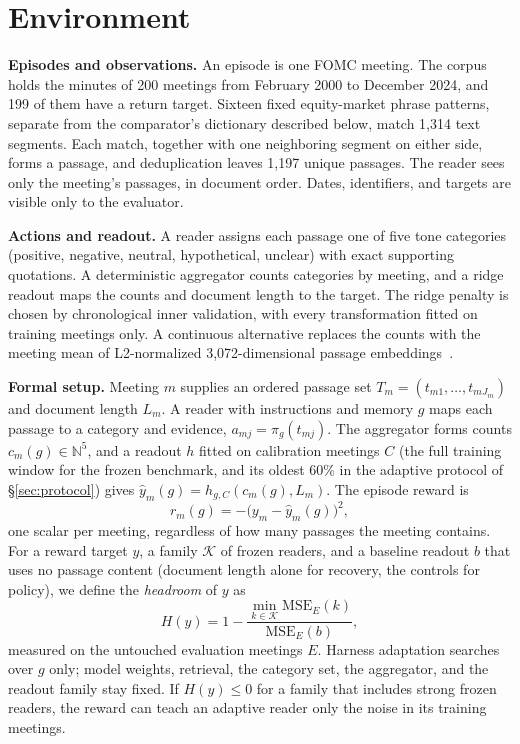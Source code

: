 \documentclass[sigconf]{acmart}
\begin{document}
\section{Environment}\label{sec:env}

\textbf{Episodes and observations.} An episode is one FOMC meeting. The corpus holds the minutes of 200 meetings from February 2000 to December 2024, and 199 of them have a return target. Sixteen fixed equity-market phrase patterns, separate from the comparator's dictionary described below, match 1,314 text segments. Each match, together with one neighboring segment on either side, forms a passage, and deduplication leaves 1,197 unique passages. The reader sees only the meeting's passages, in document order. Dates, identifiers, and targets are visible only to the evaluator.

\textbf{Actions and readout.} A reader assigns each passage one of five tone categories (positive, negative, neutral, hypothetical, unclear) with exact supporting quotations. A deterministic aggregator counts categories by meeting, and a ridge readout maps the counts and document length to the target. The ridge penalty is chosen by chronological inner validation, with every transformation fitted on training meetings only. A continuous alternative replaces the counts with the meeting mean of L2-normalized 3,072-dimensional passage embeddings~\cite{lee2025gemini}.

\textbf{Formal setup.} Meeting $m$ supplies an ordered passage set $T_m=(t_{m1},\dots,t_{mJ_m})$ and document length $L_m$. A reader with instructions and memory $g$ maps each passage to a category and evidence, $a_{mj}=\pi_g(t_{mj})$. The aggregator forms counts $c_m(g)\in\mathbb N^5$, and a readout $h$ fitted on calibration meetings $C$ (the full training window for the frozen benchmark, and its oldest 60\% in the adaptive protocol of \S\ref{sec:protocol}) gives $\hat y_m(g)=h_{g,C}(c_m(g),L_m)$. The episode reward is
\begin{equation}\label{eq:reward}
r_m(g)=-\bigl(y_m-\hat y_m(g)\bigr)^2 ,
\end{equation}
one scalar per meeting, regardless of how many passages the meeting contains. For a reward target $y$, a family $\mathcal K$ of frozen readers, and a baseline readout $b$ that uses no passage content (document length alone for recovery, the controls for policy), we define the \emph{headroom} of $y$ as
\begin{equation}\label{eq:headroom}
H(y)=1-\frac{\min_{k\in\mathcal K}\mathrm{MSE}_E(k)}{\mathrm{MSE}_E(b)},
\end{equation}
measured on the untouched evaluation meetings $E$. Harness adaptation searches over $g$ only; model weights, retrieval, the category set, the aggregator, and the readout family stay fixed. If $H(y)\le 0$ for a family that includes strong frozen readers, the reward can teach an adaptive reader only the noise in its training meetings.
\end{document}
